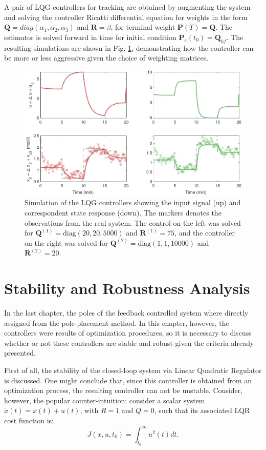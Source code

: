 \documentclass[a4paper,11pt]{book}
\numberwithin{figure}{chapter}
\numberwithin{equation}{chapter}
\numberwithin{table}{chapter}
\theoremstyle{definition}
\begin{document}
\noindent A pair of LQG controllers for tracking are obtained by augmenting the system and solving the controller Ricatti differential equation for weights in the form $\bm{Q} = diag(\alpha_1, \alpha_2, \alpha_3)$ and $\bm{R} = \beta$, for terminal weight $\bm{P}(T) = \bm{Q}$. The estimator is solved forward in time for initial condition $\bm{P}_e(t_0) = \bm{Q}_{kf}$. The resulting simulations are shown in Fig. \ref{fig:lqg02}, demonstrating how the controller can be more or less aggressive given the choice of weighting matrices.

\begin{figure}[ht]
	\centering
	\includegraphics[width=\textwidth]{chapter4/report_ch4_1}
	\caption{Simulation of the LQG controllers showing the input signal (up) and correspondent state response (down). The markers denotes the observations from the real system. The control on the left was solved for $\bm{Q}^{(1)} = \text{diag}(20, 20, 5000)$ and $\bm{R}^{(1)} = 75$, and the controller on the right was solved for $\bm{Q}^{(2)} = \text{diag}(1, 1, 10000)$ and $\bm{R}^{(2)} = 20$.}
	\label{fig:lqg02}
\end{figure}

\section{Stability and Robustness Analysis}

In the last chapter, the poles of the feedback controlled system where directly assigned from the pole-placement method. In this chapter, however, the controllers were results of optimization procedures, so it is necessary to discuss whether or not these controllers are stable and robust given the criteria already presented. 

First of all, the stability of the closed-loop system via Linear Quadratic Regulator is discussed. One might conclude that, since this controller is obtained from an optimization process, the resulting controller can not be unstable. Consider, however, the popular counter-intuition: consider a scalar system $\dot{x}(t) = x(t) + u(t)$, with $R = 1$ and $Q = 0$, such that its associated LQR cost function is:
\begin{equation}
    J(x,u,t_0) = \int_{t_0}^{\infty} u^2(t) dt
.\end{equation}
\end{document}
